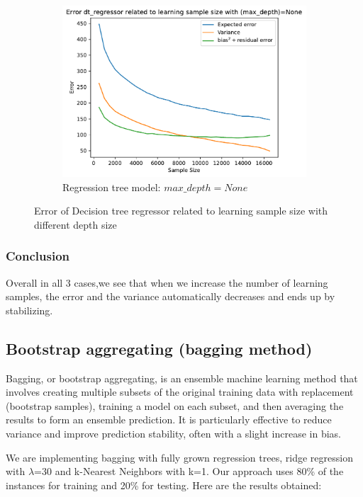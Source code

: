 \documentclass[12pt,titlepage]{article}
\begin{document}
\begin{figure}[H]\ContinuedFloat
    \centering
    \begin{subfigure}[t]{.49\textwidth}
        \includegraphics[width =\textwidth]{image/2.4_dt_regressor_None-500-17000-500.pdf}
        \caption{Regression tree model: $max\_depth = None$}
        \label{fig:ls_dt_none}
    \end{subfigure}
    \caption{Error of Decision tree regressor related to learning sample size with different depth size}
    \label{fig:ls_dt}
\end{figure}

\subsubsection{Conclusion}
Overall in all 3 cases,we see that when we increase the number of learning samples, the error and the variance
automatically decreases and ends up by stabilizing.

\subsection{Bootstrap aggregating (bagging method)}

Bagging, or bootstrap aggregating, is an ensemble machine learning method that involves creating multiple subsets of the original training data with replacement (bootstrap samples), training a model on each subset, and then averaging the results to form an ensemble prediction. It is particularly effective to reduce variance and improve prediction stability, often with a slight increase in bias.

We are implementing bagging with fully grown regression trees, ridge regression with $\lambda$=30 and k-Nearest Neighbors with k=1. Our approach uses 80\% of the instances for training and 20\% for testing. Here are the results obtained:
\end{document}
